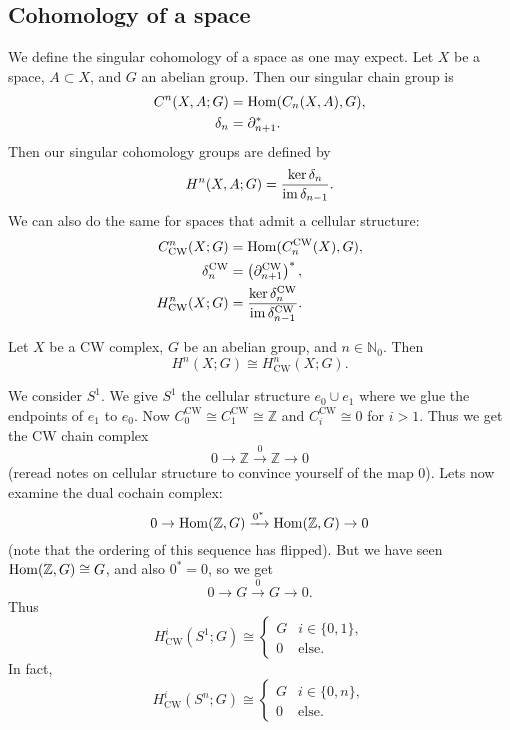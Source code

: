 \subsection{Cohomology of a space}

We define the singular cohomology of a space as one may expect. Let $X$ be a space, $A \subset X$, and $G$ an abelian group. Then our singular chain group is
\begin{align*}
    C^n(X, A; G) & = \operatorname{Hom}(C_n(X, A), G), \\
    \delta_n     & = \partial^*_{n+1}.
\end{align*}
Then our singular cohomology groups are defined by
\[
    H^n(X, A; G) = \frac
    {\ker\delta_n}
    {\operatorname{im}\delta_{n-1}}.
\]
We can also do the same for spaces that admit a cellular structure:
\begin{align*}
    C^n_{\text{CW}}(X; G) & = \operatorname{Hom}(C_n^{\text{CW}}(X), G),             \\
    \delta_n^\text{CW}    & = \left(\partial^\text{CW}_{n+1}\right)^*, \\
    H^n_{\text{CW}}(X; G) & = \frac
    {\ker\delta_n^\text{CW}}
    {\operatorname{im}\delta_{n-1}^\text{CW}}.
\end{align*}

\begin{theorem}
    Let $X$ be a CW complex, $G$ be an abelian group, and $n \in \mathbb N_0$. Then
    \[
        H^n(X; G) \cong H_\text{CW}^n(X; G).
    \]
\end{theorem}

\begin{example}
    We consider $S^1$. We give $S^1$ the cellular structure $e_0 \cup e_1$ where we glue the endpoints of $e_1$ to $e_0$. Now $C_0^\text{CW} \cong C_1^\text{CW} \cong \mathbb Z$ and $C_i^\text{CW} \cong 0$ for $i > 1$. Thus we get the CW chain complex
    \[
        0 \to \mathbb Z \xrightarrow{0} \mathbb Z \to 0
    \]
    (reread notes on cellular structure to convince yourself of the map $0$). Lets now examine the dual cochain complex:
    \[
        0 \to \operatorname{Hom}(\mathbb Z, G) \xrightarrow{0^*} \operatorname{Hom}(\mathbb Z, G) \to 0
    \]
    (note that the ordering of this sequence has flipped). But we have seen $\operatorname{Hom}(\mathbb Z, G) \cong G$, and also $0^* = 0$, so we get
    \[
        0 \to G \xrightarrow{0} G \to 0.
    \]
    Thus
    \[
        H^i_\text{CW}(S^1; G) \cong \begin{cases}
            G & i \in \{0,1\}, \\
            0 & \text{else}.
        \end{cases}
    \]
    In fact,
    \[
        H^i_\text{CW}(S^n; G) \cong \begin{cases}
            G & i \in \{0,n\}, \\
            0 & \text{else}.
        \end{cases}
    \]
\end{example}

